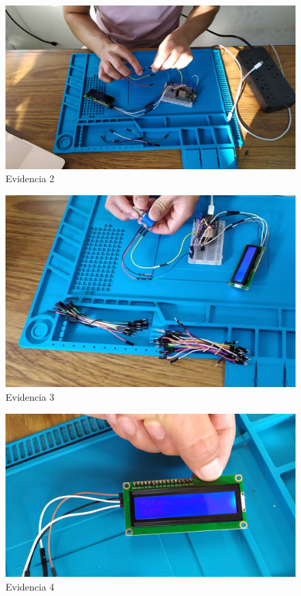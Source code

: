     \begin{figure}
        \centering
        \includegraphics[trim = {65mm 40mm 80mm 60mm},clip,scale=0.2]{35/Img/ensamble2.jpeg}
        \caption{Evidencia 2}
        \label{Evidencia 2}
    \end{figure}
    
    \begin{figure}
        \centering
        \includegraphics[trim = {65mm 40mm 80mm 60mm},clip,scale=0.6]{35/Img/ensamble3.jpeg}
        \caption{Evidencia 3}
        \label{Evidencia 3}
    \end{figure}
    
    \begin{figure}
        \centering
        \includegraphics[trim = {65mm 40mm 80mm 60mm},clip,scale=0.2]{35/Img/ensamble4.jpeg}
        \caption{Evidencia 4}
        \label{Evidencia 4}
    \end{figure}
    
